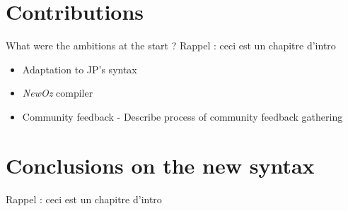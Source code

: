 \section{Contributions}\label{sec:ch1-3}

What were the ambitions at the start ?
Rappel : ceci est un chapitre d'intro
\begin{itemize}
    \item Adaptation to JP's syntax
    \item \textit{NewOz} compiler
    \item Community feedback -
    Describe process of community feedback gathering
\end{itemize}

\section{Conclusions on the new syntax}\label{sec:ch1-4}
Rappel : ceci est un chapitre d'intro